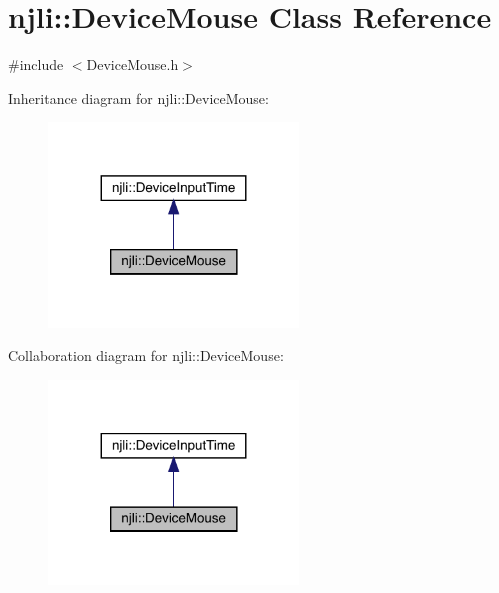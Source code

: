 \hypertarget{classnjli_1_1_device_mouse}{}\section{njli\+:\+:Device\+Mouse Class Reference}
\label{classnjli_1_1_device_mouse}


{\ttfamily \#include $<$Device\+Mouse.\+h$>$}



Inheritance diagram for njli\+:\+:Device\+Mouse\+:\nopagebreak
\begin{figure}[H]
\begin{center}
\leavevmode
\includegraphics[width=188pt]{classnjli_1_1_device_mouse__inherit__graph}
\end{center}
\end{figure}


Collaboration diagram for njli\+:\+:Device\+Mouse\+:\nopagebreak
\begin{figure}[H]
\begin{center}
\leavevmode
\includegraphics[width=188pt]{classnjli_1_1_device_mouse__coll__graph}
\end{center}
\end{figure}
